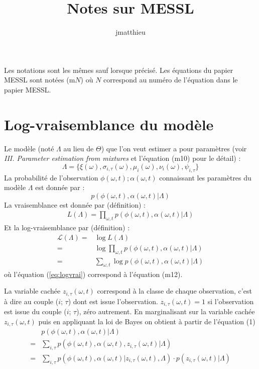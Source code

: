 \documentclass[a4paper,12pt]{article}
\title{Notes sur MESSL}
\author{jmatthieu}
\begin{document}
\maketitle
Les notations sont les mêmes sauf lorsque précisé. Les équations du papier MESSL sont notées (m$N$) où $N$ correspond au numéro de l'équation dans le papier MESSL.

\section{Log-vraisemblance du modèle}

Le modèle (noté $\Lambda$ au lieu de $\Theta$) que l'on veut estimer a pour paramètres (voir \textit{III. Parameter estimation from mixtures} et l'équation (m10) pour le détail) :
\begin{equation*}
\Lambda = \{\xi(\omega),\sigma_{i,\tau}(\omega),\mu_{i}(\omega),\nu_i(\omega),\psi_{i,\tau}\}
\end{equation*}
La probabilité de l'observation $\phi(\omega,t) ; \alpha(\omega,t)$ connaissant les paramètres du modèle $\Lambda$ est donnée par :
\begin{equation*}
p(\phi(\omega,t), \alpha(\omega,t) | \Lambda)
\end{equation*}
La vraisemblance est donnée par (définition) :
\begin{align*}
L(\Lambda) = \displaystyle \prod_{\omega,t} p(\phi(\omega,t), \alpha(\omega,t) | \Lambda)
\end{align*}
Et la log-vraisemblance par (définition) :
\begin{align}
\mathcal{L}(\Lambda) = & \log L(\Lambda) \nonumber \\
 = & \log \displaystyle \prod_{\omega,t} p(\phi(\omega,t), \alpha(\omega,t) | \Lambda) \nonumber \\
 = & \displaystyle\sum_{\omega,t} \log p(\phi(\omega,t), \alpha(\omega,t) | \Lambda) \label{eq:logvrai}
\end{align}
où l'équation (\ref{eq:logvrai}) correspond à l'équation (m12).

La variable cachée $z_{i,\tau}(\omega,t)$ correspond à la classe de chaque observation, c'est à dire au couple ($i$; $\tau$) dont est issue l'observation. $z_{i,\tau}(\omega,t) = 1$ si l'observation est issue du couple ($i$; $\tau$), zéro autrement. En marginalisant sur la variable cachée $z_{i,\tau}(\omega,t)$ puis en appliquant la loi de Bayes on obtient à partir de l'équation (1)
\begin{align}
& p(\phi(\omega,t), \alpha(\omega,t) | \Lambda)\nonumber \\
= & \displaystyle\sum_{i, \tau} p(\phi(\omega,t), \alpha(\omega,t), z_{i, \tau}(\omega,t) | \Lambda) \nonumber\\
= & \displaystyle\sum_{i, \tau} p(\phi(\omega,t), \alpha(\omega,t) | z_{i, \tau}(\omega,t), \Lambda) \cdot p(z_{i, \tau}(\omega,t) | \Lambda) \label{eq:margi}
\end{align}
\end{document}
